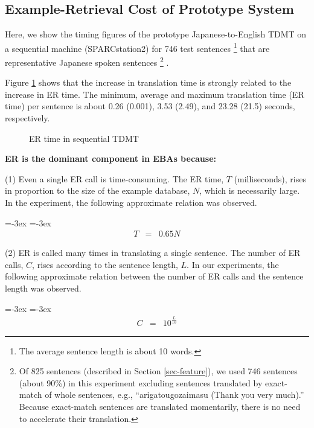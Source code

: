 \subsection{Example-Retrieval Cost of Prototype System}\label{sec-cost-prototype}
 Here, we show the timing figures of the 
prototype Japanese-to-English  TDMT 
on a sequential machine (SPARCstation2)
for 746 test sentences 
\footnote{The average sentence length is about 10 words.}
that are representative Japanese spoken sentences
\footnote{
Of 825 sentences (described in 
Section \ref{sec-feature}), 
we used 746 sentences (about 90\%) in this experiment 
excluding sentences translated by exact-match of whole sentences, 
e.g., ``arigatougozaimasu (Thank you very much).''
Because exact-match sentences are translated momentarily, there is no 
need to accelerate their translation.} .

Figure \ref{fig:fig-calc-time} shows that the increase in 
translation time
is strongly related to the increase in ER time.
The minimum, average and maximum
translation time (ER time) per sentence is about 
0.26 (0.001), 3.53 (2.49), and 23.28 (21.5) seconds, respectively.

\begin{figure}[t]
  \begin{center}
    \caption{ER time in sequential TDMT}
    \label{fig:fig-calc-time}
  \end{center}
\end{figure}


{\bf ER is the  dominant component in EBAs because:}

(1) Even a single ER call is time-consuming. The
ER time, $T$ (milliseconds), rises in proportion to
 the size of the example database, $N$, which is necessarily large. 
In the experiment, the following approximate relation was 
observed.

{
\abovedisplayskip=-3ex
\belowdisplayskip=-3ex
\begin{eqnarray}
T & = & 0.65N
\end{eqnarray}
}

(2) ER is called many times
in translating a single sentence.
The number of ER calls, $C$, 
rises according to the sentence length, $L$. 
In our experiments, the following approximate relation between 
the number of ER calls and the sentence length was observed. 

{
\abovedisplayskip=-3ex
\belowdisplayskip=-3ex
\begin{eqnarray}
C & = & 10^{\frac{L}{10}}
\end{eqnarray}
}

